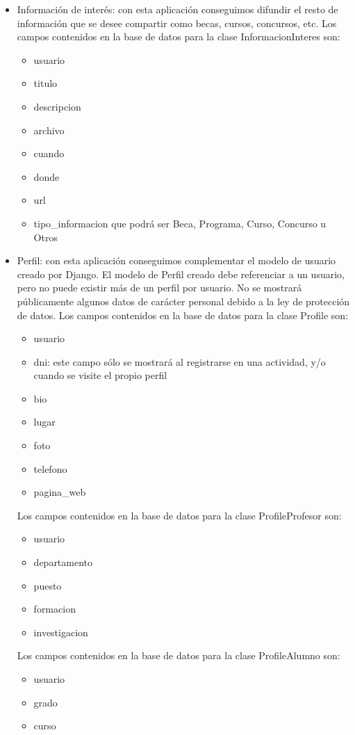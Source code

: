 \begin{itemize}
\item Información de interés: con esta aplicación conseguimos difundir el resto de información que se desee compartir como becas, cursos, concursos, etc. 
Los campos contenidos en la base de datos para la clase InformacionInteres son:
	\begin{itemize}
		\item usuario
		\item titulo
		\item descripcion
		\item archivo
		\item cuando
		\item donde
		\item url
		\item tipo\_informacion que podrá ser Beca, Programa, Curso, Concurso u Otros
	\end{itemize}
	
\item Perfil: con esta aplicación conseguimos complementar el modelo de usuario creado por Django.
El modelo de Perfil creado debe referenciar a un usuario, pero no puede existir más de un perfil por usuario. 
No se mostrará públicamente algunos datos de carácter personal debido a la ley de protección de datos.
Los campos contenidos en la base de datos para la clase Profile son:
	\begin{itemize}
		\item usuario
		\item dni: este campo sólo se mostrará al registrarse en una actividad, y/o cuando se visite el propio perfil
		\item bio
		\item lugar
		\item foto 
		\item telefono
		\item pagina\_web
	\end{itemize}
Los campos contenidos en la base de datos para la clase ProfileProfesor son:
	\begin{itemize}
		\item usuario
		\item departamento
		\item puesto
		\item formacion
		\item investigacion
	\end{itemize}
Los campos contenidos en la base de datos para la clase ProfileAlumno son:
	\begin{itemize}
		\item usuario
		\item grado
		\item curso
	\end{itemize} 


\end{itemize}
